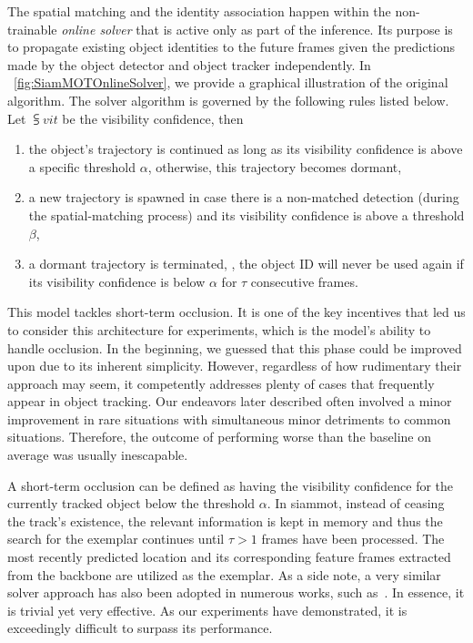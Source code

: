 
The spatial matching and the identity association happen within the non-trainable \emph{online solver} that is active only as part of the inference. Its purpose is to propagate existing object identities to the future frames given the predictions made by the object detector and object tracker independently. In \figtext{}~\ref{fig:SiamMOTOnlineSolver}, we provide a graphical illustration of the original algorithm. The solver algorithm is governed by the following rules listed below. Let $\subsup{v}{i}{t}$ be the visibility confidence, then
\begin{enumerate}
    \item the object's trajectory is continued as long as its visibility confidence is above a specific threshold $\alpha$, otherwise, this trajectory becomes dormant,
    \item a new trajectory is spawned in case there is a non-matched detection (during the spatial-matching process) and its visibility confidence is above a threshold $\beta$,
    \item a dormant trajectory is terminated, \ietext{}, the object ID will never be used again if its visibility confidence is below $\alpha$ for $\tau$ consecutive frames.
\end{enumerate}

This model tackles short-term occlusion. It is one of the key incentives that led us to consider this architecture for experiments, which is the model's ability to handle occlusion. In the beginning, we guessed that this phase could be improved upon due to its inherent simplicity. However, regardless of how rudimentary their approach may seem, it competently addresses plenty of cases that frequently appear in object tracking. Our endeavors later described often involved a minor improvement in rare situations with simultaneous minor detriments to common situations. Therefore, the outcome of performing worse than the baseline on average was usually inescapable.

A short-term occlusion can be defined as having the visibility confidence for the currently tracked object below the threshold $\alpha$. In \gls{siammot}, instead of ceasing the track's existence, the relevant information is kept in memory and thus the search for the exemplar continues until $\tau > 1$ frames have been processed. The most recently predicted location and its corresponding feature frames extracted from the backbone are utilized as the exemplar. As a side note, a very similar solver approach has also been adopted in numerous works, such as~\cite{bawley2016simple, wojke2017simple, zhou2020tracking, bergmann2019tracking}. In essence, it is trivial yet very effective. As our experiments have demonstrated, it is exceedingly difficult to surpass its performance.

